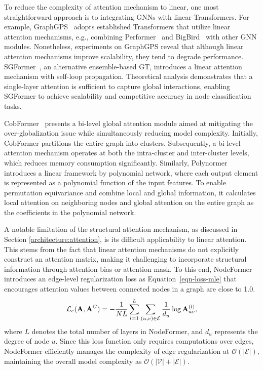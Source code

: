 To reduce the complexity of attention mechanism to linear, one most straightforward approach is to integrating GNNs with linear Transformers. For example,  GraphGPS~\cite{rampavsek2022recipe} adopts established Transformers that utilize linear attention mechanisms, e.g.,  combining Performer~\cite{choromanski2021rethinking} and BigBird~\cite{zaheer2020big} with other GNN modules. Nonetheless, experiments on GraphGPS reveal that although linear attention mechanisms improve scalability, they tend to degrade performance.
SGFormer~\cite{wu2023sgformer}, an alternative ensemble-based GT,
introduces a linear attention mechanism with self-loop propagation.
Theoretical analysis demonstrates that a single-layer attention is sufficient to capture global interactions, enabling SGFormer to achieve scalability and competitive accuracy in node classification tasks.

CobFormer~\cite{xing2024less} presents a bi-level global attention module aimed at mitigating the over-globalization issue while simultaneously reducing model complexity. Initially, CobFormer partitions the entire graph into clusters. Subsequently, a bi-level attention mechanism operates at both the intra-cluster and inter-cluster levels, which reduces memory consumption significantly. 
Similarly, Polynormer~\cite{deng2024polynormer} introduces a linear framework by polynomial network, where each output element is represented as a polynomial function of the input features. To enable permutation equivariance and combine local and global information, it calculates local attention on neighboring nodes and global attention on the entire graph as the coefficients in the polynomial network.

A notable limitation of the structural attention mechanism, as discussed in Section \ref{architecture:attention}, is its difficult applicability to linear attention. This stems from the fact that linear attention mechanisms do not explicitly construct an attention matrix, making it challenging to incorporate structural information through attention bias or attention mask. To this end, NodeFormer~\cite{wu2022nodeformer} introduces an edge-level regularization loss as Equation~\eqref{eqn-loss-mle} that encourages attention values between connected nodes in a graph are close to 1.0.
\begin{equation}\label{eqn-loss-mle}
    \mathcal L_{e}(\mathbf{A},  \mathbf{A}^{G}) = - \frac{1}{NL} \sum_{l=1}^L \sum_{(u, v)\in \mathcal E} \frac{1}{d_u} \log \mathbf{A}_{uv}^{(l)},
\end{equation}
where $L$ denotes the total number of layers in NodeFormer, and $d_u$ represents the degree of node $u$. 
Since this loss function only requires computations over edges, NodeFormer efficiently manages the complexity of edge regularization at $\mathcal{O}(|\mathcal E|)$, maintaining the overall model complexity as $\mathcal{O}(|\mathcal V| + |\mathcal E|)$.

